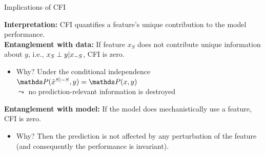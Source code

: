 \documentclass[11pt,compress,t,notes=noshow, aspectratio=169, xcolor=table]{beamer}
\begin{document}
\begin{frame}{Implications of CFI }

\textbf{Interpretation:} CFI quantifies a feature's unique contribution to the model performance.\\
\lz
\textbf{Entanglement with data:} If feature $x_S$ does not contribute unique information about $y$, i.e., $x_S \indep y | x_{-S}$, CFI is zero.\\
\begin{itemize}
  \item Why? Under the conditional independence $\P(\pert{x}{S}{-S}, y) = \P(x,y)$\\
  $\leadsto$ no prediction-relevant information is destroyed
\end{itemize}
\lz
\textbf{Entanglement with model:} If the model does mechanistically use a feature, CFI is zero.\\
\begin{itemize}
  \item Why? Then the prediction is not affected by any perturbation of the feature (and consequently the performance is invariant).
\end{itemize}

\end{frame}
\end{document}
